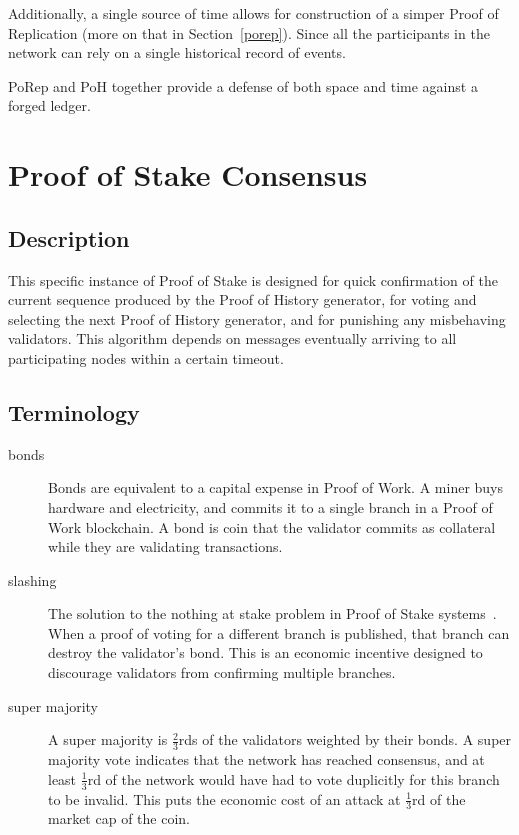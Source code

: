 \documentclass[12pt]{article}
\begin{document}
Additionally, a single source of time allows for construction of a simper Proof of Replication (more on that in Section~\ref{porep}). Since all the participants in the network can rely on a single historical record of events.

PoRep and PoH together provide a defense of both space and time against a forged ledger.


\section{Proof of Stake Consensus}\label{proof_of_stake}
\subsection{Description}
This specific instance of Proof of Stake is designed for quick confirmation of the current sequence produced by the Proof of History generator, for voting and selecting the next Proof of History generator, and for punishing any misbehaving validators. This algorithm depends on messages eventually arriving to all participating nodes within a certain timeout.
\subsection{Terminology}
\begin{description}

\item[bonds]
Bonds are equivalent to a capital expense in Proof of Work. A miner buys hardware and electricity, and commits it to a single branch in a Proof of Work blockchain. A bond is coin that the validator commits as collateral while they are validating transactions.

\item[slashing]

The solution to the nothing at stake problem in Proof of Stake systems~\cite{slasher}.  When a proof of voting for a different branch is published, that branch can destroy the validator's bond.  This is an economic incentive designed to discourage validators from confirming multiple branches.
\item[super majority]
A super majority is \(\frac{2}{3}\)rds of the validators weighted by their bonds.  A super majority vote indicates that the network has reached consensus, and at least \(\frac{1}{3}\)rd of the network would have had to vote duplicitly for this branch to be invalid.  This puts the economic cost of an attack at \(\frac{1}{3}\)rd of the market cap of the coin.

\end{description}
\end{document}

